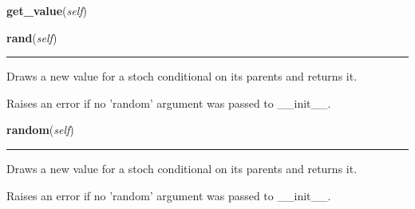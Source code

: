     \label{pymc:PyMCObjects:Stochastic:get_value}

    \vspace{0.5ex}

    \begin{boxedminipage}{\textwidth}

    \raggedright \textbf{get\_value}(\textit{self})

    \end{boxedminipage}

    \label{pymc:PyMCObjects:Stochastic:random}

    \vspace{0.5ex}

    \begin{boxedminipage}{\textwidth}

    \raggedright \textbf{rand}(\textit{self})

    \vspace{-1.5ex}

    \rule{\textwidth}{0.5\fboxrule}

Draws a new value for a stoch conditional on its parents
and returns it.

Raises an error if no 'random' argument was passed to {\_}{\_}init{\_}{\_}.
    \vspace{1ex}

    \end{boxedminipage}

    \label{pymc:PyMCObjects:Stochastic:random}

    \vspace{0.5ex}

    \begin{boxedminipage}{\textwidth}

    \raggedright \textbf{random}(\textit{self})

    \vspace{-1.5ex}

    \rule{\textwidth}{0.5\fboxrule}

Draws a new value for a stoch conditional on its parents
and returns it.

Raises an error if no 'random' argument was passed to {\_}{\_}init{\_}{\_}.
    \vspace{1ex}

    \end{boxedminipage}

